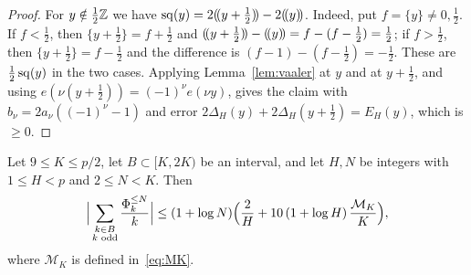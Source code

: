 \begin{proof}
For $y\notin\frac12\mathbb{Z}$ we have $\operatorname{sq}(y)=2(\!(y+\frac12)\!)-2(\!(y)\!)$. Indeed, put $f=\{y\}\ne0,\frac12$. If $f<\frac12$, then $\{y+\frac12\}=f+\frac12$ and $(\!(y+\frac12)\!)-(\!(y)\!)=f-(f-\frac12)=\frac12$; if $f>\frac12$, then $\{y+\frac12\}=f-\frac12$ and the difference is $(f-1)-(f-\frac12)=-\frac12$. These are $\frac12\operatorname{sq}(y)$ in the two cases.
Applying Lemma~\ref{lem:vaaler} at $y$ and at
$y+\frac12$, and using $e(\nu(y+\frac12))=(-1)^\nu e(\nu y)$, gives the claim with $b_\nu=2a_\nu((-1)^\nu-1)$ and error $2\Delta_H(y)+2\Delta_H(y+\frac12)=E_H(y)$,
which is $\ge0$.
\end{proof}

\begin{lemma}[Heads]\label{lem:heads}
Let $9\le K\le p/2$, let $B\subset[K,2K)$ be an interval, and let $H,N$ be integers with $1\le H<p$ and $2\le N<K$.
Then
\[
\Big|\sum_{\substack{k\in B\\ k\text{ odd}}}\frac{\Phi_k^{\le N}}{k}\Big|\le(1+\log N)\Bigl(\frac2H+10\,(1+\log H)\,
\frac{\mathcal{M}_K}{K}\Bigr),
\]
where $\mathcal{M}_K$ is defined in~\eqref{eq:MK}.
\end{lemma}

